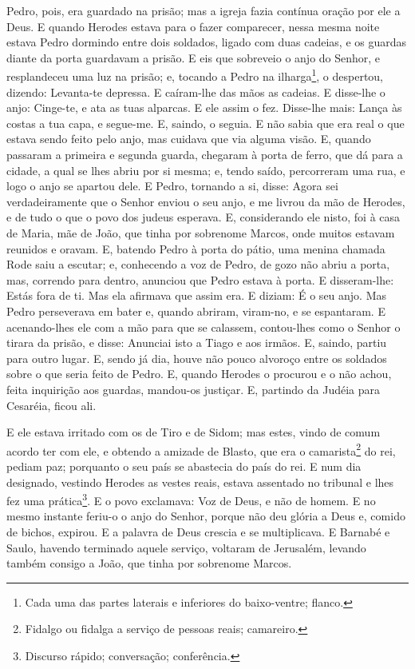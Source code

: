 Pedro, pois, era guardado na prisão; mas a igreja fazia contínua
oração por ele a Deus. E quando Herodes estava para o fazer
comparecer, nessa mesma noite estava Pedro dormindo entre dois
soldados, ligado com duas cadeias, e os guardas diante da porta
guardavam a prisão. E eis que sobreveio o anjo do Senhor, e
resplandeceu uma luz na prisão; e, tocando a Pedro na
ilharga\footnote{Cada uma das partes laterais e inferiores do
baixo-ventre; flanco.}, o despertou, dizendo: Levanta-te depressa. E
caíram-lhe das mãos as cadeias. E disse-lhe o anjo: Cinge-te, e
ata as tuas alparcas. E ele assim o fez. Disse-lhe mais: Lança às
costas a tua capa, e segue-me. E, saindo, o seguia. E não sabia
que era real o que estava sendo feito pelo anjo, mas cuidava que via
alguma visão. E, quando passaram a primeira e segunda guarda,
chegaram à porta de ferro, que dá para a cidade, a qual se lhes
abriu por si mesma; e, tendo saído, percorreram uma rua, e logo o
anjo se apartou dele. E Pedro, tornando a si, disse: Agora
sei verdadeiramente que o Senhor enviou o seu anjo, e me livrou da
mão de Herodes, e de tudo o que o povo dos judeus esperava.
E, considerando ele nisto, foi à casa de Maria, mãe de João,
que tinha por sobrenome Marcos, onde muitos estavam reunidos e
oravam. E, batendo Pedro à porta do pátio, uma menina chamada
Rode saiu a escutar; e, conhecendo a voz de Pedro, de gozo
não abriu a porta, mas, correndo para dentro, anunciou que Pedro
estava à porta. E disseram-lhe: Estás fora de ti. Mas ela
afirmava que assim era. E diziam: É o seu anjo. Mas Pedro
perseverava em bater e, quando abriram, viram-no, e se espantaram.
E acenando-lhes ele com a mão para que se calassem,
contou-lhes como o Senhor o tirara da prisão, e disse: Anunciai isto
a Tiago e aos irmãos. E, saindo, partiu para outro lugar. E,
sendo já dia, houve não pouco alvoroço entre os soldados sobre o que
seria feito de Pedro. E, quando Herodes o procurou e o não
achou, feita inquirição aos guardas, mandou-os justiçar. E, partindo
da Judéia para Cesaréia, ficou ali.

E ele estava irritado com os de Tiro e de Sidom; mas estes, vindo
de comum acordo ter com ele, e obtendo a amizade de Blasto, que era
o camarista\footnote{Fidalgo ou fidalga a serviço de pessoas reais;
camareiro.} do rei, pediam paz; porquanto o seu país se abastecia do
país do rei. E num dia designado, vestindo Herodes as vestes
reais, estava assentado no tribunal e lhes fez uma
prática\footnote{Discurso rápido; conversação; conferência.}.
E o povo exclamava: Voz de Deus, e não de homem. E no
mesmo instante feriu-o o anjo do Senhor, porque não deu glória a
Deus e, comido de bichos, expirou. E a palavra de Deus
crescia e se multiplicava. E Barnabé e Saulo, havendo
terminado aquele serviço, voltaram de Jerusalém, levando também
consigo a João, que tinha por sobrenome Marcos.

